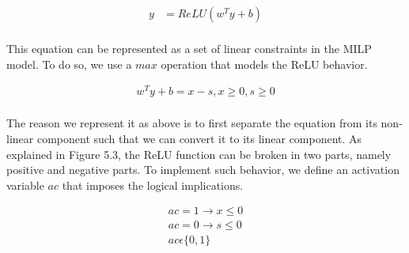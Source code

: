 \begin{equation}
\begin{aligned}
y &= ReLU(w^Ty + b) \\
\end{aligned}
\end{equation}

This equation can be represented as a set of linear constraints in the \ac{MILP} model. 
To do so, we use a $max$ operation that models the ReLU behavior. 

\begin{equation}
\begin{aligned}
w^Ty + b = x - s, x \geq 0, s \geq 0 \\
\end{aligned}
\end{equation}

The reason we represent it as above is to first separate the equation from its non-linear component such that we can convert it to its linear component. 
As explained in Figure 5.3, the ReLU function can be broken in two parts, namely positive and negative parts.  
To implement such behavior, we define an activation variable $ac$ that imposes the logical implications. 

\begin{equation}
\begin{aligned}
ac =  1 \rightarrow x \leq 0  \\
ac =  0 \rightarrow s \leq 0  \\
ac \epsilon  \{0,1\} \\
\end{aligned}
\end{equation}

